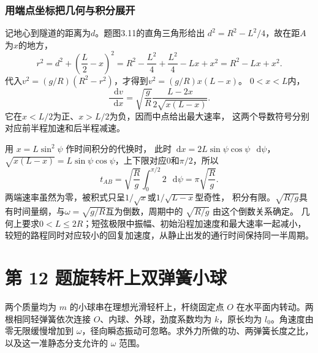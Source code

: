 \documentclass[UTF8,fontset=fandol,a4paper,11pt]{ctexart}
\newcommand{\dd}{\mathop{}\!\mathrm{d}}
\newcommand{\tagline}[1]{\noindent{\small\color{muted}#1}\par}
\newcommand{\figcaption}[1]{\par\vspace{2pt}{\small\color{muted}#1}\par}
\begin{document}
\subsubsection*{用端点坐标把几何与积分展开}
记地心到隧道的距离为$d$。题图3.11的直角三角形给出
$d^2=R^2-L^2/4$，故在距$A$为$x$的地方，
\[
r^2=d^2+\left(\frac L2-x\right)^2
=R^2-\frac{L^2}{4}+\frac{L^2}{4}-Lx+x^2
=R^2-Lx+x^2.
\]
代入$v^2=(g/R)(R^2-r^2)$，才得到$v^2=(g/R)x(L-x)$。
$0<x<L$内，
\[
\frac{\dd v}{\dd x}
=\sqrt{\frac gR}\frac{L-2x}{2\sqrt{x(L-x)}}.
\]
它在$x<L/2$为正、$x>L/2$为负，因而中点给出最大速率，
这两个导数符号分别对应前半程加速和后半程减速。

用 $x=L\sin^2\psi$ 作时间积分的代换时，
此时$\dd x=2L\sin\psi\cos\psi\,\dd\psi$，
$\sqrt{x(L-x)}=L\sin\psi\cos\psi$，上下限对应$0$和$\pi/2$，所以
\[
t_{AB}=\sqrt{\frac Rg}\int_0^{\pi/2}2\,\dd\psi
=\pi\sqrt{\frac Rg}.
\]
两端速率虽然为零，被积式只呈$1/\sqrt{x}$或$1/\sqrt{L-x}$型奇性，
积分有限。$
\sqrt{R/g}$具有时间量纲，与$\omega=\sqrt{g/R}$互为倒数，周期中的 $\sqrt{R/g}$ 由这个倒数关系确定。
几何上要求$0<L\leq2R$；短弦极限中振幅、初始沿程加速度和最大速率一起减小，
较短的路程同时对应较小的回复加速度，从静止出发的通行时间保持同一半周期。




\section*{第 12 题\quad 旋转杆上双弹簧小球}

\tagline{M-03-12}

两个质量均为 $m$ 的小球串在理想光滑轻杆上，杆绕固定点 $O$ 在水平面内转动。两根相同轻弹簧依次连接 $O$、内球、外球，劲度系数均为 $k$，原长均为 $l_0$。角速度由零无限缓慢增加到 $\omega$，径向瞬态振动可忽略。求外力所做的功、两弹簧长度之比，以及这一准静态分支允许的 $\omega$ 范围。

\begin{center}\begin{minipage}{\linewidth}\centering{}
\figcaption{图 3.12\quad 外球到转轴的距离为 $l_1+l_2$。}
\end{minipage}\end{center}
\end{document}
